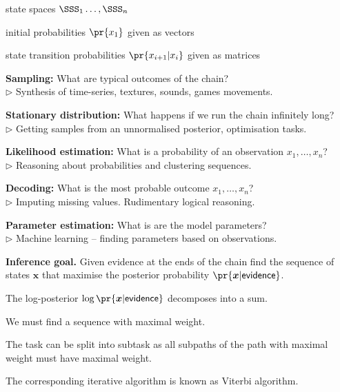 \documentclass[landscape,footrule]{foils}
\renewcommand{\vec}[1]{\boldsymbol{#1}}
\begin{document}
\begin{triangles}
\item state spaces $\SSS_1\ldots,\SSS_n$
\item initial probabilities $\pr{x_1}$ given as vectors 
\item state transition probabilities $\pr{x_{i+1}|x_{i}}$ given as matrices
\end{triangles}


\textbf{Sampling:} What are typical outcomes of the chain?\\
$\triangleright$ Synthesis of time-series, textures, sounds, games movements. 
\vspace*{1.5ex} 

\textbf{Stationary distribution:} What happens if we run the chain infinitely long?\\
$\triangleright$ Getting samples from an unnormalised posterior, optimisation tasks. 
\vspace*{1.5ex}  

\textbf{Likelihood estimation:} What is a probability of an observation $x_1,\ldots,x_n$?\\
$\triangleright$ Reasoning about probabilities and clustering sequences.
\vspace*{1.5ex} 

\textbf{Decoding:} What is the most probable outcome $x_1,\ldots,x_n$?\\ 
$\triangleright$ Imputing missing values. Rudimentary logical reasoning. 
\vspace*{1.5ex} 

\textbf{Parameter estimation:} What is are the model parameters?\\
$\triangleright$ Machine learning -- finding parameters based on observations.



\textbf{Inference goal.}
Given evidence at the ends of the chain find the sequence of states $\vec{x}$ that maximise the posterior probability $\pr{\vec{x}|\mathsf{evidence}}$.
\begin{triangles}
\item The log-posterior $\log\pr{\vec{x}|\mathsf{evidence}}$ decomposes into a sum.
\item We must find a sequence with maximal weight.
\item The task can be split into subtask as all subpaths of the path with maximal weight must have maximal weight. 
\item The corresponding iterative algorithm is known as Viterbi algorithm.
\end{triangles}
\end{document}
